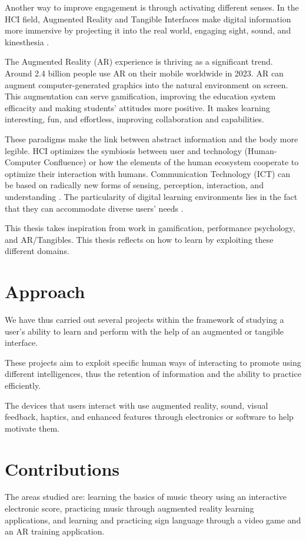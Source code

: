 Another way to improve engagement is through activating different senses. In the HCI field, Augmented Reality and Tangible Interfaces make digital information more immersive by projecting it into the real world, engaging sight, sound, and kinesthesia \cite{seichter2007augmented}.

The Augmented Reality (AR) experience is thriving as a significant trend. Around 2.4 billion people use AR on their mobile worldwide in 2023. AR can augment computer-generated graphics into the natural environment on screen. This augmentation can serve gamification, improving the education system efficacity and making students' attitudes more positive. It makes learning interesting, fun, and effortless, improving collaboration and capabilities.

These paradigms make the link between abstract information and the body more legible.
HCI optimizes the symbiosis between user and technology (Human-Computer Confluence) or how the elements of the human ecosystem cooperate to optimize their interaction with humans. Communication Technology (ICT) can be based on radically new forms of sensing, perception, interaction, and understanding \cite{ferscha2007human}. The particularity of digital learning environments lies in the fact that they can accommodate diverse users' needs \cite{stephanidis2019seven}.

This thesis takes inspiration from work in gamification, performance psychology, and AR/Tangibles. This thesis reflects on how to learn by exploiting these different domains.

\section{Approach}

We have thus carried out several projects within the framework of studying a user's ability to learn and perform with the help of an augmented or tangible interface.

These projects aim to exploit specific human ways of interacting to promote using different intelligences, thus the retention of information and the ability to practice efficiently. 

The devices that users interact with use augmented reality, sound, visual feedback, haptics, and enhanced features through electronics or software to help motivate them.

\section{Contributions}

The areas studied are: learning the basics of music theory using an interactive electronic score, practicing music through augmented reality learning applications, and learning and practicing sign language through a video game and an AR training application.